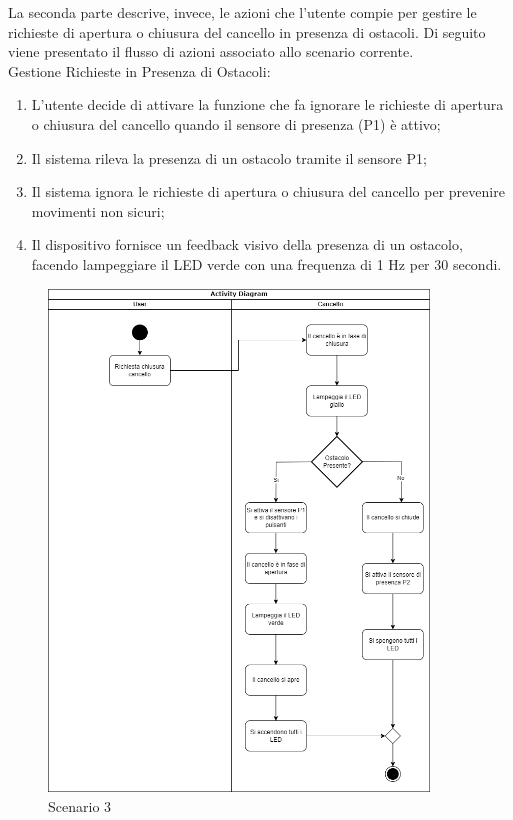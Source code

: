 La seconda parte descrive, invece, le azioni che l’utente compie per gestire le richieste di apertura o chiusura del cancello in presenza di ostacoli.
Di seguito viene presentato il flusso di azioni associato allo scenario corrente. \\

\noindent Gestione Richieste in Presenza di Ostacoli:

\begin{enumerate}
    \item L’utente decide di attivare la funzione che fa ignorare le richieste di apertura o chiusura del cancello quando il sensore di presenza (P1) è attivo;
    \item Il sistema rileva la presenza di un ostacolo tramite il sensore P1;
    \item Il sistema ignora le richieste di apertura o chiusura del cancello per prevenire movimenti non sicuri;
    \item Il dispositivo fornisce un feedback visivo della presenza di un ostacolo, facendo lampeggiare il LED verde con una frequenza di 1 Hz per 30 secondi.
\end{enumerate}


\begin{figure}[H]
    \centering
    \includegraphics[width=0.9\textwidth]{figures/scenario3.drawio.png}
    \caption{Scenario 3}
    \label{scenario3}
\end{figure}


